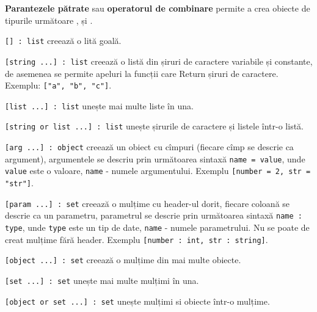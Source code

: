 {\bf Parantezele pătrate} sau {\bf operatorul de combinare} permite a crea obiecte de tipurile următoare \listtype{}, \set{} și \object{}.

\texttt{[] : list} creează o lită goală.

\texttt{[string ...] : list} creează o listă din șiruri de caractere variabile și constante, de asemenea se permite apeluri la funcții care Return șiruri de caractere. Exemplu: \texttt{["a", "b", "c"]}.

\texttt{[list ...] : list} unește mai multe liste în una.

\texttt{[string or list ...] : list} unește șirurile de caractere și listele într-o listă.

\texttt{[arg ...] : object} creează un obiect cu cîmpuri (fiecare cîmp se descrie ca argument), argumentele se descriu prin următoarea sintaxă \texttt{name = value}, unde \texttt{value} este o valoare, \texttt{name} - numele argumentului. Exemplu \texttt{[number = 2, str = "str"]}.

\texttt{[param ...] : set} creează o mulțime cu header-ul dorit, fiecare coloană se descrie ca un parametru, parametrul se descrie prin următoarea sintaxă \texttt{name : type}, unde \texttt{type} este un tip de date, \texttt{name} - numele parametrului. Nu se poate de creat mulțime fără header. Exemplu \texttt{[number : int, str : string]}.

\texttt{[object ...] : set} creează o mulțime din mai multe obiecte.

\texttt{[set ...] : set} unește mai multe mulțimi în una.

\texttt{[object or set ...] : set} unește mulțimi si obiecte într-o mulțime.

